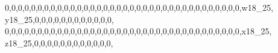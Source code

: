 \documentclass[]{article}
\newenvironment{Shaded}{\begin{snugshade}}{\end{snugshade}}
\newcommand{\DecValTok}[1]{\textcolor[rgb]{0.00,0.00,0.81}{#1}}
\newcommand{\NormalTok}[1]{#1}
\begin{document}
\begin{Shaded}
\begin{Highlighting}[]
\DecValTok{0}\NormalTok{,}\DecValTok{0}\NormalTok{,}\DecValTok{0}\NormalTok{,}\DecValTok{0}\NormalTok{,}\DecValTok{0}\NormalTok{,}\DecValTok{0}\NormalTok{,}\DecValTok{0}\NormalTok{,}\DecValTok{0}\NormalTok{,}\DecValTok{0}\NormalTok{,}\DecValTok{0}\NormalTok{,}\DecValTok{0}\NormalTok{,}\DecValTok{0}\NormalTok{,}\DecValTok{0}\NormalTok{,}\DecValTok{0}\NormalTok{,}\DecValTok{0}\NormalTok{,}\DecValTok{0}\NormalTok{,}\DecValTok{0}\NormalTok{,}\DecValTok{0}\NormalTok{,}\DecValTok{0}\NormalTok{,}\DecValTok{0}\NormalTok{,}\DecValTok{0}\NormalTok{,}\DecValTok{0}\NormalTok{,}\DecValTok{0}\NormalTok{,}\DecValTok{0}\NormalTok{,}\DecValTok{0}\NormalTok{,}\DecValTok{0}\NormalTok{,}\DecValTok{0}\NormalTok{,}\DecValTok{0}\NormalTok{,}\DecValTok{0}\NormalTok{,}\DecValTok{0}\NormalTok{,}\DecValTok{0}\NormalTok{,}\DecValTok{0}\NormalTok{,}\DecValTok{0}\NormalTok{,}\DecValTok{0}\NormalTok{,}\DecValTok{0}\NormalTok{,}\DecValTok{0}\NormalTok{,w18_}\DecValTok{25}\NormalTok{, y18_}\DecValTok{25}\NormalTok{,}\DecValTok{0}\NormalTok{,}\DecValTok{0}\NormalTok{,}\DecValTok{0}\NormalTok{,}\DecValTok{0}\NormalTok{,}\DecValTok{0}\NormalTok{,}\DecValTok{0}\NormalTok{,}\DecValTok{0}\NormalTok{,}\DecValTok{0}\NormalTok{,}\DecValTok{0}\NormalTok{,}\DecValTok{0}\NormalTok{,}\DecValTok{0}\NormalTok{,}\DecValTok{0}\NormalTok{,}
\DecValTok{0}\NormalTok{,}\DecValTok{0}\NormalTok{,}\DecValTok{0}\NormalTok{,}\DecValTok{0}\NormalTok{,}\DecValTok{0}\NormalTok{,}\DecValTok{0}\NormalTok{,}\DecValTok{0}\NormalTok{,}\DecValTok{0}\NormalTok{,}\DecValTok{0}\NormalTok{,}\DecValTok{0}\NormalTok{,}\DecValTok{0}\NormalTok{,}\DecValTok{0}\NormalTok{,}\DecValTok{0}\NormalTok{,}\DecValTok{0}\NormalTok{,}\DecValTok{0}\NormalTok{,}\DecValTok{0}\NormalTok{,}\DecValTok{0}\NormalTok{,}\DecValTok{0}\NormalTok{,}\DecValTok{0}\NormalTok{,}\DecValTok{0}\NormalTok{,}\DecValTok{0}\NormalTok{,}\DecValTok{0}\NormalTok{,}\DecValTok{0}\NormalTok{,}\DecValTok{0}\NormalTok{,}\DecValTok{0}\NormalTok{,}\DecValTok{0}\NormalTok{,}\DecValTok{0}\NormalTok{,}\DecValTok{0}\NormalTok{,}\DecValTok{0}\NormalTok{,}\DecValTok{0}\NormalTok{,}\DecValTok{0}\NormalTok{,}\DecValTok{0}\NormalTok{,}\DecValTok{0}\NormalTok{,}\DecValTok{0}\NormalTok{,}\DecValTok{0}\NormalTok{,}\DecValTok{0}\NormalTok{,x18_}\DecValTok{25}\NormalTok{, z18_}\DecValTok{25}\NormalTok{,}\DecValTok{0}\NormalTok{,}\DecValTok{0}\NormalTok{,}\DecValTok{0}\NormalTok{,}\DecValTok{0}\NormalTok{,}\DecValTok{0}\NormalTok{,}\DecValTok{0}\NormalTok{,}\DecValTok{0}\NormalTok{,}\DecValTok{0}\NormalTok{,}\DecValTok{0}\NormalTok{,}\DecValTok{0}\NormalTok{,}\DecValTok{0}\NormalTok{,}\DecValTok{0}\NormalTok{,}

\end{Highlighting}
\end{Shaded}
\end{document}
